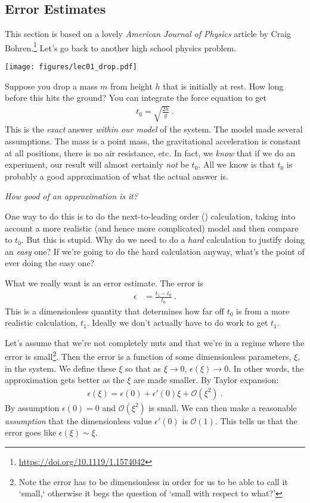 \subsection{Error Estimates}

This section is based on a lovely \emph{American Journal of Physics} article by Craig Bohren.\footnote{\url{https://doi.org/10.1119/1.1574042}} Let’s go back to another high school physics problem. 

\begin{center}
\texttt{[image: figures/lec01\_drop.pdf]}
\end{center}

Suppose you drop a mass $m$ from height $h$ that is initially at rest. How long before this hits the ground? You can integrate the force equation to get
\begin{align}
  t_0 = \sqrt{\frac{2h}{g}} \ .
\end{align}
This is the \emph{exact} answer \emph{within our model} of the system. The model made several assumptions. The mass is a point mass, the gravitational acceleration is constant at all positions, there is no air resistance, etc. In fact, we \emph{know} that if we do an experiment, our result will almost certainly \emph{not} be $t_0$. All we know is that $t_0$ is probably a good approximation of what the actual answer is.

\emph{How good of an approximation is it?}

One way to do this is to do the next-to-leading order () calculation, taking into account a more realistic (and hence more complicated) model and then compare to $t_0$. But this is stupid. Why do we need to do a \emph{hard} calculation to justify doing an \emph{easy} one? If we’re going to do the hard calculation anyway, what’s the point of ever doing the easy one?

What we really want is an error estimate. The error is
\begin{align}
  \epsilon &= \frac{t_1 - t_0}{t_0} \ .
\end{align}
This is a dimensionless quantity that determines how far off $t_0$ is from a more realistic calculation, $t_1$. Ideally we don’t actually have to do work to get $t_1$. 

Let’s assume that we’re not completely nuts and that we’re in a regime where the error is small\footnote{Note the error has to be dimensionless in order for us to be able to call it `small,` otherwise it begs the question of `small with respect to what?'}. Then the error is a function of some dimensionless parameters, $\xi$, in the system. We define these $\xi$ so that as $\xi \to 0$, $\epsilon(\xi) \to 0$. In other words, the approximation gets better as the $\xi$ are made smaller. By Taylor expansion:
\begin{align}
  \epsilon(\xi) = \epsilon(0) + \epsilon'(0) \xi + \mathcal O(\xi^2) \ .
\end{align}
By assumption  $\epsilon(0) = 0$ and $\mathcal O(\xi^2)$ is  small. We can then make a reasonable \emph{assumption} that the dimensionless value $\epsilon'(0)$  is $\mathcal O(1)$. This tells us that the error goes like $\epsilon(\xi) \sim \xi$.

